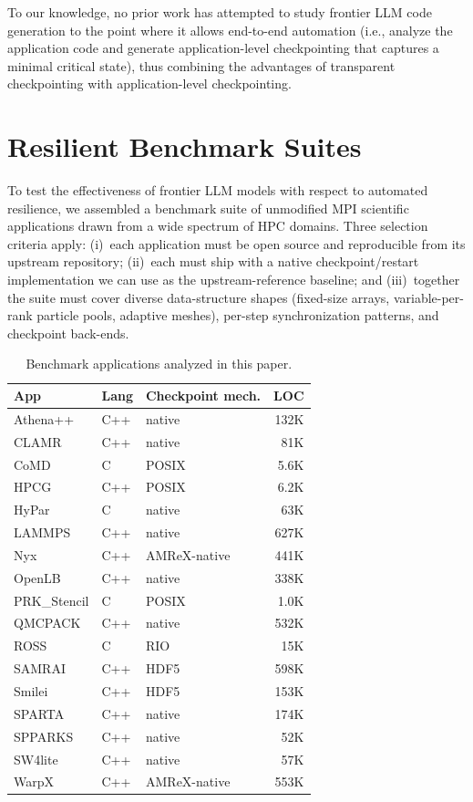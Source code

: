 \documentclass[conference]{IEEEtran}
\begin{document}
To our knowledge, no prior work has attempted to study frontier LLM code generation to the point where it allows end-to-end automation (i.e., analyze the application code and generate application-level checkpointing that captures a minimal critical state), thus combining the advantages of transparent checkpointing with application-level checkpointing.

\section{Resilient Benchmark Suites}
\label{sec:suite}

To test the effectiveness of frontier LLM models with respect to automated resilience, we assembled a benchmark suite of unmodified MPI scientific applications drawn from a wide spectrum of HPC domains. Three selection criteria apply: (i)~each application must be open source and reproducible from its upstream repository; (ii)~each must ship with a native checkpoint/restart implementation we can use as the upstream-reference baseline; and (iii)~together the suite must cover diverse data-structure shapes (fixed-size arrays, variable-per-rank particle pools, adaptive meshes), per-step synchronization patterns, and checkpoint back-ends.

\begin{table}[t]
\centering
\caption{Benchmark applications analyzed in this paper.}
\label{tab:apps}
\small
\setlength{\tabcolsep}{4pt}
\begin{tabular}{@{}lllr@{}}
\toprule
App & Lang & Checkpoint mech. & LOC \\
\midrule
Athena++    & C++ & native        & 132K \\
CLAMR       & C++ & native        & 81K  \\
CoMD        & C   & POSIX         & 5.6K \\
HPCG        & C++ & POSIX         & 6.2K \\
HyPar       & C   & native        & 63K  \\
LAMMPS      & C++ & native        & 627K \\
Nyx         & C++ & AMReX-native  & 441K \\
OpenLB      & C++ & native        & 338K \\
PRK\_Stencil & C   & POSIX         & 1.0K \\
QMCPACK     & C++ & native        & 532K \\
ROSS        & C   & RIO           & 15K  \\
SAMRAI      & C++ & HDF5          & 598K \\
Smilei      & C++ & HDF5          & 153K \\
SPARTA      & C++ & native        & 174K \\
SPPARKS     & C++ & native        & 52K  \\
SW4lite     & C++ & native        & 57K  \\
WarpX       & C++ & AMReX-native  & 553K \\
\bottomrule
\end{tabular}
\end{table}
\end{document}
